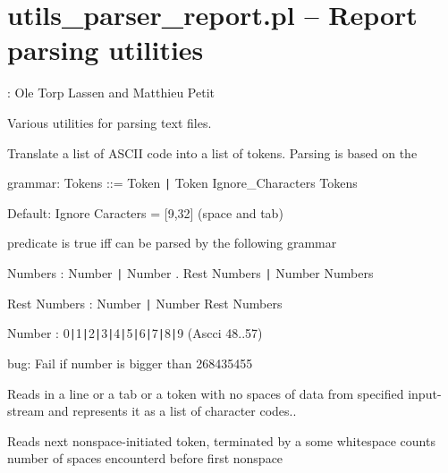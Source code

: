 


\section{utils_parser_report.pl -- Report parsing utilities}

\label{sec:utilsparserreport}

\begin{tags}
: Ole Torp Lassen and Matthieu Petit
\end{tags}

Various utilities for parsing text files.\vspace{0.7cm}

\begin{description}
Translate a list of ASCII code into a list of tokens. Parsing is based on the

grammar: Tokens ::= Token {\tt\string|} Token Ignore_Characters Tokens

Default: Ignore Caracters = [9,32] (space and tab)

predicate is true iff  can be parsed by the following grammar

Numbers :\Sequal{} Number {\tt\string|} Number . Rest Numbers {\tt\string|} Number Numbers

Rest Numbers :\Sequal{} Number {\tt\string|} Number Rest Numbers

Number :\Sequal{} 0{\tt\string|}1{\tt\string|}2{\tt\string|}3{\tt\string|}4{\tt\string|}5{\tt\string|}6{\tt\string|}7{\tt\string|}8{\tt\string|}9 (Ascci 48..57)

bug: Fail if number is bigger than 268435455

Reads in a line or a tab or a token with no spaces of data from specified input-stream
and represents it as a list of character codes..

Reads next nonspace-initiated token, terminated by a some whitespace
counts number of spaces encounterd before first nonspace
\end{description}

